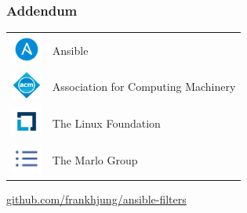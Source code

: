\documentclass[pdf]{beamer}
\begin{document}
\begin{frame}
  \frametitle{Addendum}
  \begin{tabular}{ m{1cm} m{6cm} }
    \includegraphics[width=1.0cm]{ansible-logo.png} & Ansible \\
    \includegraphics[width=1.0cm]{acm-logo.png} & Association for Computing Machinery \\
    \includegraphics[width=1.0cm]{thelinuxfoundation-logo.png} & The Linux Foundation \\
    \includegraphics[width=1.0cm]{themarlogroup-logo.png} & The Marlo Group
  \end{tabular}
\end{frame}

\begin{frame}{}
  \begin{center}
    \Large{\insertauthor} \par
    \large{\insertinstitute} \par
    \large{\url{github.com/frankhjung/ansible-filters}}
  \end{center}
\end{frame}
\end{document}
